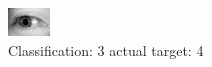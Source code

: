 \begin{figure}[h!]
\begin{center}
\includegraphics[width=0.60\columnwidth]{figures/ID3234_class_3_target_4.png}
\end{center}
\caption{ Classification: 3 actual target: 4}
\label{fig:ID3234_class_3_target_4}
\end{figure}
